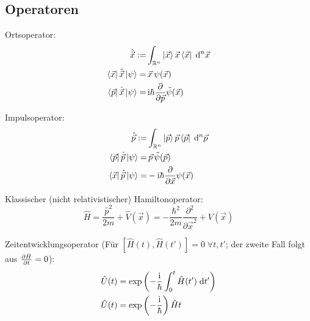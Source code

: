 \documentclass[11pt]{article}
\DeclareMathOperator*{\SumInt}{%
\mathchoice%
  {\ooalign{$\displaystyle\sum$\cr\hidewidth$\displaystyle\int$\hidewidth\cr}}
  {\ooalign{\raisebox{.14\height}{\scalebox{.7}{$\textstyle\sum$}}\cr\hidewidth$\textstyle\int$\hidewidth\cr}}
  {\ooalign{\raisebox{.2\height}{\scalebox{.6}{$\scriptstyle\sum$}}\cr$\scriptstyle\int$\cr}}
  {\ooalign{\raisebox{.2\height}{\scalebox{.6}{$\scriptstyle\sum$}}\cr$\scriptstyle\int$\cr}}
}
\numberwithin{equation}{section}
\begin{document}
		\subsection{Operatoren}
			\noindent
			Ortsoperator:
			\begin{equation}
				\begin{aligned}
					\hat{\vec{x}} :=& \int_{\mathbb{R}^n} \Ket{\vec{x}} \vec{x} \Bra{\vec{x}}\;\mathrm{d}^n\vec{x} \\
					\Bra{\vec{x}}\hat{\vec{x}}\Ket{\psi} =& \,\vec{x}\, \psi(\vec{x}) \\
					\Bra{\vec{p}}\hat{\vec{x}}\Ket{\psi} =& \,\mathrm{i}\hbar\frac{\partial }{\partial \vec{p}}\tilde{\psi}(\vec{x}) \\
				\end{aligned}
			\end{equation}

			\noindent
			Impulsoperator:
			\begin{equation}
				\begin{aligned}
					\hat{\vec{p}} :=& \int_{\mathbb{R}^n} \Ket{\vec{p}} \vec{p} \Bra{\vec{p}}\;\mathrm{d}^n\vec{p} \\
					\Bra{\vec{p}}\hat{\vec{p}}\Ket{\psi} =& \,\vec{p}\, \tilde{\psi}(\vec{p}) \\
					\Bra{\vec{x}}\hat{\vec{p}}\Ket{\psi} =& -\mathrm{i}\hbar\frac{\partial }{\partial \vec{x}} \psi(\vec{x}) \\
				\end{aligned}
			\end{equation}

			\noindent
			Klassischer (nicht relativistischer) Hamiltonoperator:
			\begin{equation}
				\hat{H} = \frac{\hat{p}^2}{2m}+\hat{V}(\vec{x}) = -\frac{\hbar^2}{2m}\frac{\partial^2}{\partial \vec{x}^2} + V(\vec{x})
			\end{equation}

			\noindent
			Zeitentwicklungsoperator (Für $\left[\hat{H}(t),\hat{H}(t')\right] = 0\;\forall t,t'$; der zweite Fall folgt aus $\frac{\partial \hat{H}}{\partial t}=0$):
			\begin{equation}
				\begin{aligned}
					\hat{U}(t) &= \exp{\left(-\frac{ \mathrm{i} }{\hbar}\int_0^t \hat{H}(t')\; \mathrm{d} t'\right)} \\
					\hat{U}(t) &= \exp{\left(-\frac{ \mathrm{i} }{\hbar}\right)\hat{H} t} \\
				\end{aligned}
			\end{equation}
\end{document}
